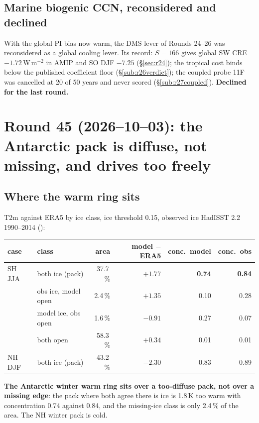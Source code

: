 \documentclass[10pt]{article}
\begin{document}
\subsection{Marine biogenic CCN, reconsidered and declined}\label{sub:r44dms}

With the global PI bias now warm, the DMS lever of Rounds 24--26 was reconsidered as a global
cooling lever. Its record: $S=166$ gives global SW CRE $-1.72$\,W\,m$^{-2}$ in AMIP and SO DJF
$-7.25$ (\S\ref{sec:r24}); the tropical cost binds below the published coefficient floor
(\S\ref{sub:r26verdict}); the coupled probe 11F was cancelled at 20 of 50 years and never scored
(\S\ref{sub:r27coupled}). \textbf{Declined for the last round.}

\section{Round 45 (2026--10--03): the Antarctic pack is diffuse, not missing, and drives too freely}\label{sec:round45}

\subsection{Where the warm ring sits}\label{sub:r45class}

T2m against ERA5 by ice class, ice threshold 0.15, observed ice HadISST 2.2 1990--2014
():

\begin{center}\small
\begin{tabular}{llrrrr}
\toprule
case & class & area & model $-$ ERA5 & conc.\ model & conc.\ obs \\
\midrule
SH JJA & both ice (pack)        & 37.7\,\% & $\mathbf{+1.77}$ & \textbf{0.74} & \textbf{0.84} \\
       & obs ice, model open    & 2.4\,\%  & $+1.35$ & 0.10 & 0.28 \\
       & model ice, obs open    & 1.6\,\%  & $-0.91$ & 0.27 & 0.07 \\
       & both open              & 58.3\,\% & $+0.34$ & 0.01 & 0.01 \\
NH DJF & both ice (pack)        & 43.2\,\% & $-2.30$ & 0.83 & 0.89 \\
\bottomrule
\end{tabular}
\end{center}

\textbf{The Antarctic winter warm ring sits over a too-diffuse pack, not over a missing edge}: the
pack where both agree there is ice is 1.8\,K too warm with concentration 0.74 against 0.84, and the
missing-ice class is only 2.4\,\% of the area. The NH winter pack is cold.
\end{document}
